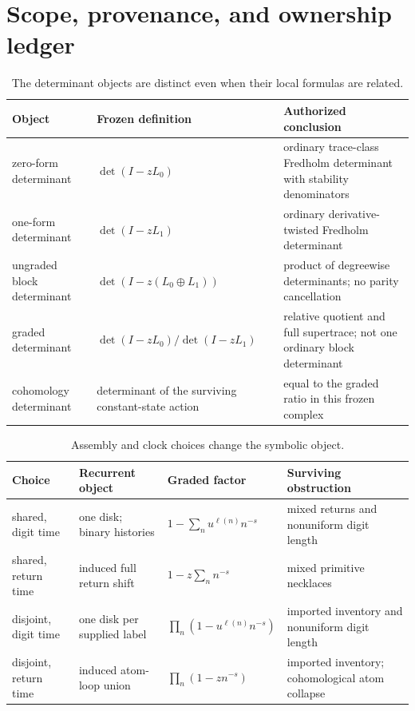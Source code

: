\section{Scope, provenance, and ownership ledger}
\label{app:scope}

\begin{table}[ht]
\centering
\caption{The determinant objects are distinct even when their local formulas
are related.}
\label{tab:ownership-ledger}
\small
\begin{tabularx}{\textwidth}{L{3.4cm}L{4.3cm}Y}
\toprule
Object & Frozen definition & Authorized conclusion \\
\midrule
zero-form determinant
& $\det(I-zL_0)$
& ordinary trace-class Fredholm determinant with stability denominators \\
one-form determinant
& $\det(I-zL_1)$
& ordinary derivative-twisted Fredholm determinant \\
ungraded block determinant
& $\det(I-z(L_0\oplus L_1))$
& product of degreewise determinants; no parity cancellation \\
graded determinant
& $\det(I-zL_0)/\det(I-zL_1)$
& relative quotient and full supertrace; not one ordinary block determinant \\
cohomology determinant
& determinant of the surviving constant-state action
& equal to the graded ratio in this frozen complex \\
\bottomrule
\end{tabularx}
\end{table}

\begin{table}[ht]
\centering
\caption{Assembly and clock choices change the symbolic object.}
\label{tab:object-ledger}
\small
\begin{tabularx}{\textwidth}{L{2.5cm}L{3.3cm}L{4.1cm}Y}
\toprule
Choice & Recurrent object & Graded factor & Surviving obstruction \\
\midrule
shared, digit time
& one disk; binary histories
& $1-\sum_nu^{\ell(n)}n^{-s}$
& mixed returns and nonuniform digit length \\
shared, return time
& induced full return shift
& $1-z\sum_nn^{-s}$
& mixed primitive necklaces \\
disjoint, digit time
& one disk per supplied label
& $\prod_n(1-u^{\ell(n)}n^{-s})$
& imported inventory and nonuniform digit length \\
disjoint, return time
& induced atom-loop union
& $\prod_n(1-zn^{-s})$
& imported inventory; cohomological atom collapse \\
\bottomrule
\end{tabularx}
\end{table}

